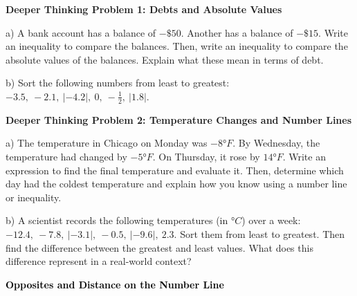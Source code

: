 \documentclass[12pt, letterpaper, fleqn]{article}
\begin{document}
\vspace{4mm}

\begin{tcolorbox}[colback=white, colframe=black, boxrule=1pt, arc=4mm, left=6mm, right=6mm, top=5mm, bottom=5mm]
\textbf{Deeper Thinking Problem 1: Debts and Absolute Values}

\medskip

\noindent 
a) A bank account has a balance of $-\$50$. Another has a balance of $-\$15$. Write an inequality to compare the balances. Then, write an inequality to compare the absolute values of the balances. Explain what these mean in terms of debt.

\vspace{2cm}

\noindent
b) Sort the following numbers from least to greatest: $-3.5, \ -2.1, \ |-4.2|, \ 0, \ -\frac{1}{2}, \ |1.8|$.

\vspace{2cm}
\end{tcolorbox}

\begin{tcolorbox}[colback=white, colframe=black, boxrule=1pt, arc=4mm, left=6mm, right=6mm, top=5mm, bottom=5mm]
\textbf{Deeper Thinking Problem 2: Temperature Changes and Number Lines}
\medskip 

\noindent
a) The temperature in Chicago on Monday was $-8°F$. By Wednesday, the temperature had changed by $-5°F$. On Thursday, it rose by $14°F$. Write an expression to find the final temperature and evaluate it. Then, determine which day had the coldest temperature and explain how you know using a number line or inequality.
\vspace{2.5cm}

\noindent
b) A scientist records the following temperatures (in $°C$) over a week:
$-12.4, \ -7.8, \ |-3.1|, \ -0.5, \ |{-9.6}|, \ 2.3$.
Sort them from least to greatest. Then find the difference between the greatest and least values. What does this difference represent in a real-world context?
\vspace{2.5cm}
\end{tcolorbox}

\newpage

\begin{tcolorbox}[colback=black!10]
    \large\textcolor{black}{\textbf{Opposites and Distance on the Number Line}}
\end{tcolorbox}
\end{document}
